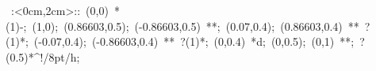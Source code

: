 %


\hbox{
\xy    <2cm,0cm>:<0cm,2cm>::
       (0,0) *\ellipse(1){-}; (1,0);
       (0.86603,0.5); (-0.86603,0.5) **\dir{-}; 
       (0.07,0.4); (0.86603,0.4) **\dir{-} ?(1)*\dir{>}; 
       (-0.07,0.4); (-0.86603,0.4) **\dir{-} ?(1)*\dir{>}; 
       (0,0.4) *{d}; 
       (0,0.5); (0,1) **\dir{-}; ?(0.5)*^!/8pt/{h};        
\endxy}





